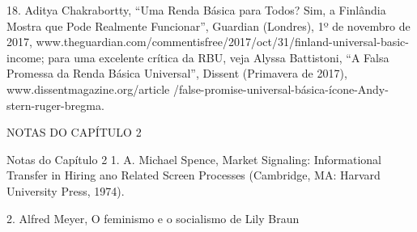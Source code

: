 \par 
18. Aditya Chakrabortty, “Uma Renda Básica para Todos? Sim, a Finlândia Mostra que Pode Realmente Funcionar”, Guardian (Londres), 1º de novembro de 2017, www.theguardian.com/commentisfree/2017/oct/31/finland-universal-basic-income; para uma excelente crítica da RBU, veja Alyssa Battistoni, “A Falsa Promessa da Renda Básica Universal”, Dissent (Primavera de 2017), www.dissentmagazine.org/article /false-promise-universal-básica-ícone-Andy-stern-ruger-bregma.
 \par 
NOTAS DO CAPÍTULO {\color{blue}2}
 \par 
Notas do Capítulo {\color{blue}2} 1. A. Michael Spence, Market Signaling: Informational Transfer in Hiring ano Related Screen Processes (Cambridge, MA: Harvard University Press, 1974).
 \par 
2. Alfred Meyer, O feminismo e o socialismo de Lily Braun
 \par 
